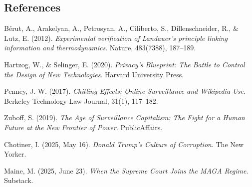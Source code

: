 \documentclass[
]{article}
\begin{document}
\subsection{References}\label{references}

Bérut, A., Arakelyan, A., Petrosyan, A., Ciliberto, S., Dillenschneider, R., \& Lutz, E. (2012). \emph{Experimental verification of Landauer's principle linking information and thermodynamics}. Nature, 483(7388), 187--189.

Hartzog, W., \& Selinger, E. (2020). \emph{Privacy's Blueprint: The Battle to Control the Design of New Technologies}. Harvard University Press.

Penney, J. W. (2017). \emph{Chilling Effects: Online Surveillance and Wikipedia Use}. Berkeley Technology Law Journal, 31(1), 117--182.

Zuboff, S. (2019). \emph{The Age of Surveillance Capitalism: The Fight for a Human Future at the New Frontier of Power}. PublicAffairs.

Chotiner, I. (2025, May 16). \emph{Donald Trump's Culture of Corruption}. The New Yorker.

Maine, M. (2025, June 23). \emph{When the Supreme Court Joins the MAGA Regime}. Substack.
\end{document}
